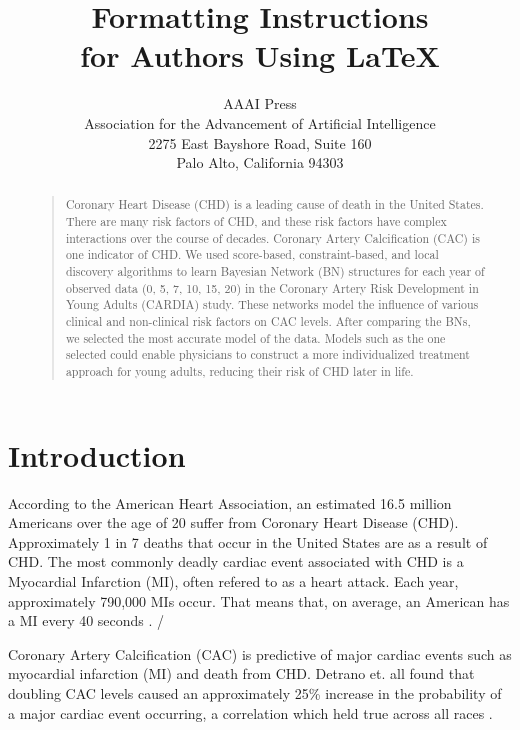 \documentclass[letterpaper]{article}
\begin{document}
%
\title{Formatting Instructions \\for Authors Using \LaTeX{}}
\author{AAAI Press\\
Association for the Advancement of Artificial Intelligence\\
2275 East Bayshore Road, Suite 160\\
Palo Alto, California 94303\\
}


\maketitle
\begin{abstract}
\begin{quote}
Coronary Heart Disease (CHD) is a leading cause of death in the United States. There are many risk factors of CHD, and these risk factors have complex interactions over the course of decades. Coronary Artery Calcification (CAC) is one indicator of CHD. We used score-based, constraint-based, and local discovery algorithms to learn Bayesian Network (BN) structures for each year of observed data (0, 5, 7, 10, 15, 20) in the Coronary Artery Risk Development in Young Adults (CARDIA) study. These networks model the influence of various clinical and non-clinical risk factors on CAC levels. After comparing the BNs, we selected the most accurate model of the data. Models such as the one selected could enable physicians to construct a more individualized treatment approach for young adults, reducing their risk of CHD later in life.  
\end{quote}
\end{abstract}

\setcounter{secnumdepth}{1}
\section{Introduction}
According to the American Heart Association, an estimated 16.5 million Americans over the age of 20 suffer from Coronary Heart Disease (CHD). Approximately 1 in 7 deaths that occur in the United States are as a result of CHD. The most commonly deadly cardiac event associated with CHD is a Myocardial Infarction (MI), often refered to as a heart attack. Each year, approximately 790,000 MIs occur. That means that, on average, an American has a MI every 40 seconds \cite{Benjamin2017}. /

Coronary Artery Calcification (CAC) is predictive of major cardiac events such as myocardial infarction (MI) and death from CHD. Detrano et. all found that doubling CAC levels caused an approximately 25\% increase in the probability of a major cardiac event occurring, a correlation which held true across all races \cite{Detrano2008}. 
\end{document}
